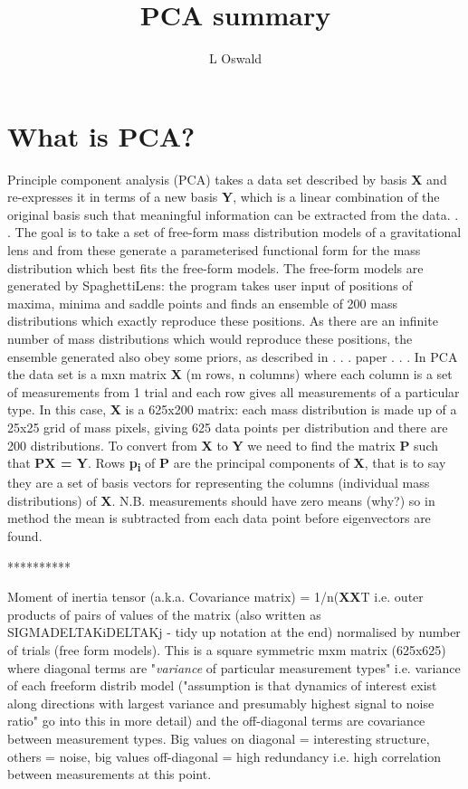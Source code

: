 \documentclass{article}
\begin{document}
\title{PCA summary}
\author{L Oswald}
\date{}

\maketitle



\section{What is PCA?}

Principle component analysis (PCA) takes a data set described by basis \textbf{X} and re-expresses it in terms of a new basis \textbf{Y}, which is a linear combination of the original basis such that meaningful information can be extracted from the data. . .
The goal is to take a set of free-form mass distribution models of a gravitational lens and from these generate a parameterised functional form for the mass distribution which best fits the free-form models.
The free-form models are generated by SpaghettiLens: the program takes user input of positions of maxima, minima and saddle points and finds an ensemble of 200 mass distributions which exactly reproduce these positions. As there are an infinite number of mass distributions which would reproduce these positions, the ensemble generated also obey some priors, as described in . . . paper . . .
In PCA the data set is a mxn matrix \textbf{X} (m rows, n columns) where each column is a set of measurements from 1 trial and each row gives all measurements of a particular type. In this case, \textbf{X} is a 625x200 matrix: each mass distribution is made up of a 25x25 grid of mass pixels, giving 625 data points per distribution and there are 200 distributions.
To convert from \textbf{X} to \textbf{Y} we need to find the matrix \textbf{P} such that \textbf{PX = Y}. Rows \textbf{p\textsubscript{i}} of \textbf{P} are the principal components of \textbf{X}, that is to say they are a set of basis vectors for representing the columns (individual mass distributions) of \textbf{X}.
N.B. measurements should have zero means (why?) so in method the mean is subtracted from each data point before eigenvectors are found.

**********

Moment of inertia tensor (a.k.a. Covariance matrix) = 1/n(\textbf{XX}T i.e. outer products of pairs of values of the matrix (also written as SIGMADELTAKiDELTAKj - tidy up notation at the end) normalised by number of trials (free form models).
This is a square symmetric mxm matrix (625x625) where diagonal terms are "\emph{variance} of particular measurement types" i.e. variance of each freeform distrib model ("assumption is that dynamics of interest exist along directions with largest variance and presumably highest signal to noise ratio" go into this in more detail) and the off-diagonal terms are covariance between measurement types. Big values on diagonal = interesting structure, others = noise, big values off-diagonal = high redundancy i.e. high correlation between measurements at this point.
\end{document}
